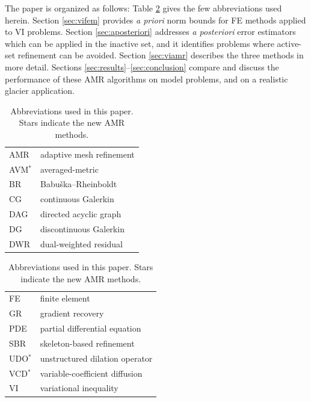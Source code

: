 \documentclass[]{interact}
\theoremstyle{plain}%
\theoremstyle{definition}
\theoremstyle{remark}
\begin{document}
The paper is organized as follows:  Table \ref{tab:abbrev} gives the few abbreviations used herein.  Section \ref{sec:vifem} provides \emph{a priori} norm bounds for FE methods applied to VI problems.  Section \ref{sec:aposteriori} addresses \emph{a posteriori} error estimators which can be applied in the inactive set, and it identifies problems where active-set refinement can be avoided.  Section \ref{sec:viamr} describes the three methods in more detail.  Sections \ref{sec:results}--\ref{sec:conclusion} compare and discuss the performance of these AMR algorithms on model problems, and on a realistic glacier application.

\begin{table}[ht]
\centering
\begin{minipage}[t]{0.45\textwidth}
\vspace{0pt}
{\small
\begin{tabular}{ll} \\
AMR       & adaptive mesh refinement \\
AVM$^*$   & averaged-metric \\
BR        & Babu\v{s}ka--Rheinboldt \\
CG        & continuous Galerkin \\
DAG       & directed acyclic graph \\
DG        & discontinuous Galerkin \\
DWR       & dual-weighted residual
\end{tabular}
}
\end{minipage}
\quad
\begin{minipage}[t]{0.45\textwidth}
\vspace{0pt}
{\small
\begin{tabular}{ll} \\
FE        & finite element \\
GR        & gradient recovery \\
PDE       & partial differential equation \\
SBR       & skeleton-based refinement \\
UDO$^*$   & unstructured dilation operator \\
VCD$^*$   & variable-coefficient diffusion \\
VI        & variational inequality
\end{tabular}
}
\end{minipage}


\caption{Abbreviations used in this paper.  Stars indicate the new AMR methods.}
\label{tab:abbrev}
\end{table}
\end{document}
